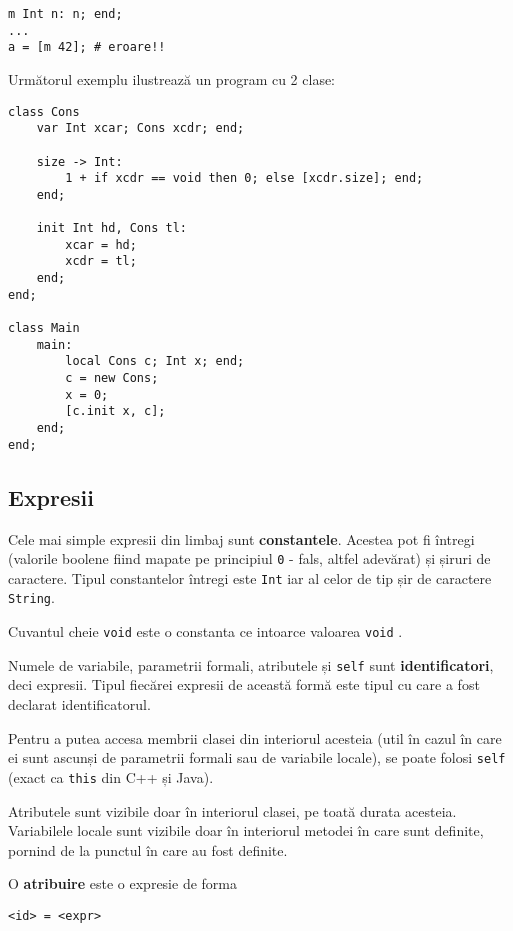 \documentclass[12pt]{article}
\begin{document}
\begin{verbatim}
m Int n: n; end;
...
a = [m 42]; # eroare!!
\end{verbatim}

Următorul exemplu ilustrează un program cu 2 clase:

\begin{verbatim}
class Cons 
    var Int xcar; Cons xcdr; end;
    
    size -> Int:
        1 + if xcdr == void then 0; else [xcdr.size]; end;
    end;

    init Int hd, Cons tl:
        xcar = hd;
        xcdr = tl;
    end;
end;

class Main
    main:
        local Cons c; Int x; end;
        c = new Cons;
        x = 0;
        [c.init x, c];
    end;
end;
\end{verbatim}




\subsection{Expresii}

Cele mai simple expresii din limbaj sunt \textbf{constantele}. Acestea pot fi întregi (valorile boolene fiind mapate pe principiul \texttt{0} - fals, altfel adevărat) și șiruri de caractere. Tipul constantelor întregi este \texttt{Int} iar al celor de tip șir de caractere \texttt{String}.

Cuvantul cheie \texttt{void} este o constanta ce intoarce valoarea \texttt{void} .

Numele de variabile, parametrii formali, atributele și \texttt{self} sunt \textbf{identificatori}, deci expresii.  Tipul fiecărei expresii de această formă este tipul cu care a fost declarat identificatorul.

Pentru a putea accesa membrii clasei din interiorul acesteia (util în cazul în care ei sunt ascunși de parametrii formali sau de variabile locale), se poate folosi \texttt{self} (exact ca \texttt{this} din C++ și Java).

Atributele sunt vizibile doar în interiorul clasei, pe toată durata acesteia. Variabilele locale sunt vizibile doar în interiorul metodei în care sunt definite, pornind de la punctul în care au fost definite.

O \textbf{atribuire} este o expresie de forma

\begin{verbatim}
<id> = <expr>
\end{verbatim}
\end{document}
